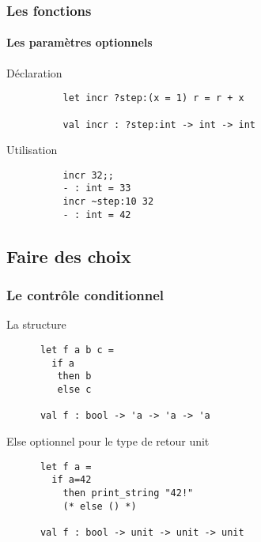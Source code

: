 \begin{frame}[fragile]
	\frametitle{Les fonctions}
	\framesubtitle{Les paramètres optionnels}	

	 	\begin{block}{Déclaration}
		\begin{lstlisting}
		  let incr ?step:(x = 1) r = r + x
		  
		  val incr : ?step:int -> int -> int
		\end{lstlisting}
		\end{block}

	 	\begin{block}{Utilisation}
		\begin{lstlisting}
		  incr 32;;
		  - : int = 33
		  incr ~step:10 32
		  - : int = 42
		\end{lstlisting}
		\end{block}

\end{frame}

\subsection{Faire des choix} %
\begin{frame}[fragile]
	\frametitle{Le contrôle conditionnel}
	\begin{block}{La structure}
	\begin{lstlisting}
	  let f a b c = 
	    if a
	     then b 
	     else c

	  val f : bool -> 'a -> 'a -> 'a
	\end{lstlisting}
	\end{block}
	\begin{block}{Else optionnel pour le type de retour unit}
	\begin{lstlisting}
	  let f a =
	    if a=42
	      then print_string "42!" 
	      (* else () *)

	  val f : bool -> unit -> unit -> unit
	\end{lstlisting}
	\end{block}
\end{frame}

